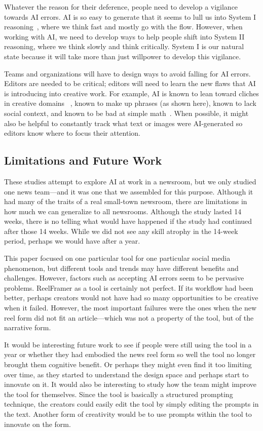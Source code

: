 Whatever the reason for their deference, people need to develop a vigilance towards AI errors. 
AI is so easy to generate that it seems to lull us into System I reasoning~\cite{kahneman2011thinking}, where we think fast and mostly go with the flow. 
However, when working with AI, we need to develop ways to help people shift into System II reasoning, where we think slowly and think critically. 
System I is our natural state because it will take more than just willpower to develop this vigilance. 

Teams and organizations will have to design ways to avoid falling for AI errors. 
Editors are needed to be critical; editors will need to learn the new flaws that AI is introducing into creative work. 
For example, AI is known to lean toward cliches in creative domains ~\cite{tuhin_artifice, deepmind_humor}, known to make up phrases (as shown here), known to lack social context, and known to be bad at simple math~\cite{toolformer}. 
When possible, it might also be helpful to constantly track what text or images were AI-generated so editors know where to focus their attention.  

\subsection{Limitations and Future Work}
These studies attempt to explore AI at work in a newsroom, but we only studied one news team---and it was one that we assembled for this purpose. 
Although it had many of the traits of a real small-town newsroom, there are limitations in how much we can generalize to all newsrooms.  
Although the study lasted 14 weeks, there is no telling what would have happened if the study had continued after those 14 weeks. 
While we did not see any skill atrophy in the 14-week period, perhaps we would have after a year. 

This paper focused on one particular tool for one particular social media phenomenon, but different tools and trends may have different benefits and challenges. 
However, factors such as accepting AI errors seem to be pervasive problems. 
ReelFramer as a tool is certainly not perfect. If its workflow had been better, perhaps creators would not have had so many opportunities to be creative when it failed. 
However, the most important failures were the ones when the new reel form did not fit an article---which was not a property of the tool, but of the narrative form. 

It would be interesting future work to see if people were still using the tool in a year or whether they had embodied the news reel form so well the tool no longer brought them cognitive benefit. 
Or perhaps they might even find it too limiting over time, as they started to understand the design space and perhaps start to innovate on it. 
It would also be interesting to study how the team might improve the tool for themselves. 
Since the tool is basically a structured prompting technique, the creators could easily edit the tool by simply editing the prompts in the text. 
Another form of creativity would be to use prompts within the tool to innovate on the form.
